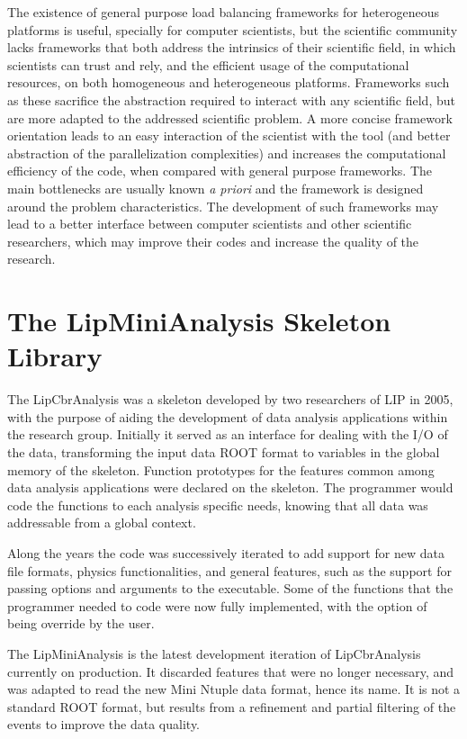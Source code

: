The existence of general purpose load balancing frameworks for heterogeneous platforms is useful, specially for computer scientists, but the scientific community lacks frameworks that both address the intrinsics of their scientific field, in which scientists can trust and rely, and the efficient usage of the computational resources, on both homogeneous and heterogeneous platforms. Frameworks such as these sacrifice the abstraction required to interact with any scientific field, but are more adapted to the addressed scientific problem. A more concise framework orientation leads to an easy interaction of the scientist with the tool (and better abstraction of the parallelization complexities) and increases the computational efficiency of the code, when compared with general purpose frameworks. The main bottlenecks are usually known \textit{a priori} and the framework is designed around the problem characteristics. The development of such frameworks may lead to a better interface between computer scientists and other scientific researchers, which may improve their codes and increase the quality of the research.

\section{The LipMiniAnalysis Skeleton Library}
\label{lipminianalysis}

The LipCbrAnalysis was a skeleton developed by two researchers of LIP in 2005, with the purpose of aiding the development of data analysis applications within the research group. Initially it served as an interface for dealing with the I/O of the data, transforming the input data ROOT format to variables in the global memory of the skeleton. Function prototypes for the features common among data analysis applications were declared on the skeleton. The programmer would code the functions to each analysis specific needs, knowing that all data was addressable from a global context.

Along the years the code was successively iterated to add support for new data file formats, physics functionalities, and general features, such as the support for passing options and arguments to the executable. Some of the functions that the programmer needed to code were now fully implemented, with the option of being override by the user.

The LipMiniAnalysis is the latest development iteration of LipCbrAnalysis currently on production. It discarded features that were no longer necessary, and was adapted to read the new Mini Ntuple data format, hence its name. It is not a standard ROOT format, but results from a refinement and partial filtering of the events to improve the data quality.

